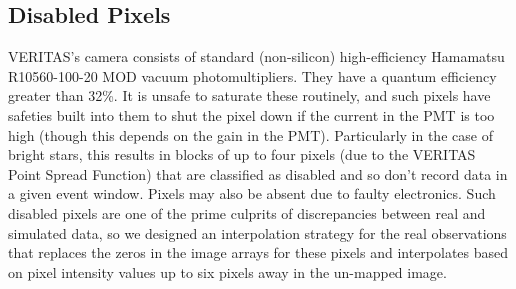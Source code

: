 \subsection{Disabled Pixels}
VERITAS's camera consists of standard (non-silicon) high-efficiency \cite{vercam} Hamamatsu R10560-100-20 MOD vacuum photomultipliers. They have a quantum efficiency greater than 32\%. It is unsafe to saturate these routinely, and such pixels have safeties built into them to shut the pixel down if the current in the PMT is too high (though this depends on the gain in the PMT). Particularly in the case of bright stars, this results in blocks of up to four pixels (due to the VERITAS Point Spread Function) that are classified as disabled and so don't record data in a given event window. Pixels may also be absent due to faulty electronics. Such disabled pixels are one of the prime culprits of discrepancies between real and simulated data, so we designed an interpolation strategy for the real observations that replaces the zeros in the image arrays for these pixels and interpolates based on pixel intensity values up to six pixels away in the un-mapped image.  


